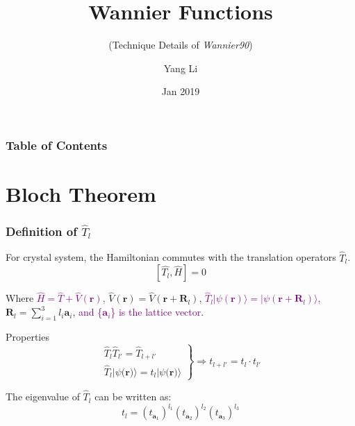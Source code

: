 \documentclass{beamer}
\title[CMT.Tsinghua]{Wannier Functions}
\subtitle{(Technique Details of \emph{Wannier90})}
\author[Yang Li]
{Yang Li\inst{1}}
\institute[Physics@Tsinghua] 
{
  \inst{1}%
  Department of Physics\\
  Tsinghua University 
}
\date[Tsinghua Physics 2019]{Jan 2019}
\begin{document}
  \frame{\titlepage}

  \begin{frame}
    \frametitle{Table of Contents}
    \tableofcontents
  \end{frame}
  
  \section{Bloch Theorem}

  \begin{frame}
    \frametitle{Definition of \(\widehat{T}_l\)}
    For crystal system, the Hamiltonian commutes with the translation operators \(\widehat{T}_l\).
    \begin{equation}
      \left[\widehat{T_l},\widehat{H}\right] = 0
    \end{equation}

    Where  \textcolor{purple}{\(\widehat{H} = \widehat{T} + \widehat{V}(\mathbf{r})\),} \(\widehat{V}(\mathbf{r}) = \widehat{V}(\mathbf{r}+\mathbf{R}_l)\), \textcolor{purple}{\(\widehat{T}_l|\psi(\mathbf{r})\rangle = |\psi(\mathbf{r}+\mathbf{R}_l)\rangle\),} \(\mathbf{R}_l = \sum_{i=1}^3l_i\mathbf{a}_i\), \textcolor{purple}{and \{\(\mathbf{a}_i\)\} is the lattice vector}.
     
    \begin{block}{Properties}
      \begin{displaymath} 
        \left. \begin{array}{r}
          \widehat{T}_l\widehat{T}_{l'} = \widehat{T}_{l+l'}\\
          \widehat{T}_l|\psi({\mathbf{r})}\rangle = t_l|\psi({\mathbf{r})}\rangle
        \end{array}  \right\} \Rightarrow t_{l+l'} = t_l\cdot{}t_{l'}
      \end{displaymath}
    \end{block}

    The eigenvalue of \(\widehat{T}_l\) can be written as: 
    \begin{equation}
      t_l = \left(t_{\mathbf{a}_1}\right)^{l_1}\left(t_{\mathbf{a}_2}\right)^{l_2}\left(t_{\mathbf{a}_3}\right)^{l_3}
    \end{equation}  

  \end{frame}
\end{document}
